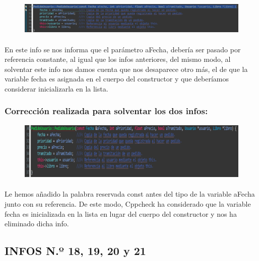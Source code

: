 			\begin{figure}[H]
				\centering
				\includegraphics[scale=0.55]{img/esteban24.png}
				\label{esteban24}
			\end{figure}
		
			\paragraph{}En este info se nos informa que el parámetro aFecha, debería ser pasado por referencia constante, al igual que los infos anteriores, del mismo modo, al solventar este info nos damos cuenta que nos desaparece otro más, el de que la variable fecha es asignada en el cuerpo del constructor y que deberíamos considerar inicializarla en la lista.
			
		\subsubsection{Corrección realizada para solventar los dos infos:}
		
			\begin{figure}[H]
				\centering
				\includegraphics[scale=0.55]{img/esteban25.png}
				\label{esteban25}
			\end{figure}
		
			\paragraph{}Le hemos añadido la palabra reservada const antes del tipo de la variable aFecha junto con su referencia. De este modo, Cppcheck ha considerado que la variable fecha es inicializada en la lista en lugar del cuerpo del constructor y nos ha eliminado dicha info.
			
	\subsection{INFOS N.º 18, 19, 20 y 21}
	
